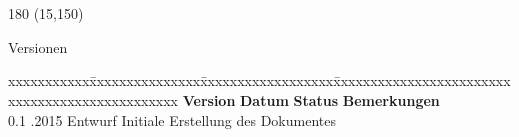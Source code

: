 

\chapter*{}
\label{chap:versionen}

\begin{textblock}{180} (15,150)
\color{black}
\begin{huge}
Versionen
\end{huge}
\vspace{10mm}

\fontsize{10pt}{18pt}\selectfont
\begin{tabbing}
xxxxxxxxxxx\=xxxxxxxxxxxxxxx\=xxxxxxxxxxxxxxxxxx\=xxxxxxxxxxxxxxxxxxxxxxxxxxxxxxxxxxxxxxxxxxxxxxx     \kill
\textbf{Version}    \> \textbf{Datum}   \> \textbf{Status}      \> \textbf{Bemerkungen}               \\
0.1                 .2015       \> Entwurf              \> Initiale Erstellung des Dokumentes \\
\end{tabbing}

\end{textblock}
